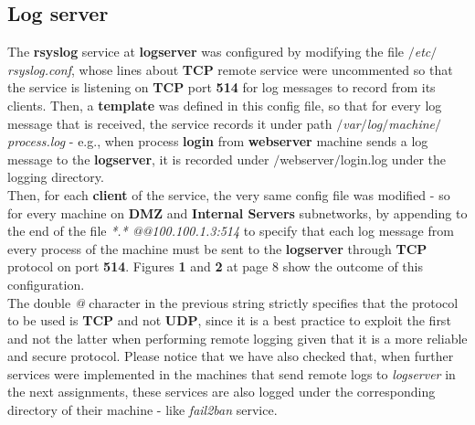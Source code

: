 \subsection{Log server}
The \textbf{rsyslog} service at \textbf{logserver} was configured by modifying the file \textit{$/$etc$/$rsyslog.conf}, whose lines about \textbf{TCP} remote service were uncommented so that the service is listening on \textbf{TCP} port \textbf{514} for log messages to record from its clients. Then, a \textbf{template} was defined in this config file, so that for every log message that is received, the service records it under path \textit{$/$var$/$log$/$machine$/$process.log} - e.g., when process \textbf{login} from \textbf{webserver} machine sends a log message to the \textbf{logserver}, it is recorded under $/$webserver$/$login.log under the logging directory.\\
Then, for each \textbf{client} of the service, the very same config file was modified - so for every machine on \textbf{DMZ} and \textbf{Internal Servers} subnetworks, by appending to the end of the file \textit{*.* @@100.100.1.3:514} to specify that each log message from every process of the machine must be sent to the \textbf{logserver} through \textbf{TCP} protocol on port \textbf{514}. Figures \textbf{1} and \textbf{2} at page 8 show the outcome of this configuration.\\
The double \textit{@} character in the previous string strictly specifies that the protocol to be used is \textbf{TCP} and not \textbf{UDP}, since it is a best practice to exploit the first and not the latter when performing remote logging given that it is a more reliable and secure protocol. Please notice that we have also checked that, when further services were implemented in the machines that send remote logs to \textit{logserver} in the next assignments, these services are also logged under the corresponding directory of their machine - like \textit{fail2ban} service.

